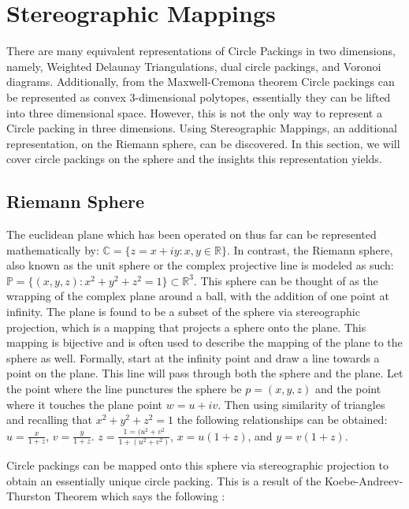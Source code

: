 \documentclass[11pt]{article}
\newcommand{\R}{\mathbb{R}}
\newcommand{\C}{\mathbb{C}}
\theoremstyle{definition}
\begin{document}
\section{Stereographic Mappings}

	There are many equivalent representations of Circle Packings in two dimensions, namely, Weighted Delaunay Triangulations, dual circle packings, and Voronoi diagrams. 
	Additionally, from the Maxwell-Cremona theorem Circle packings can be represented as convex 3-dimensional polytopes, essentially they can be lifted into three dimensional space. 
	However, this is not the only way to represent a Circle packing in three dimensions. 
	Using Stereographic Mappings, an additional representation, on the Riemann sphere, can be discovered. 
	In this section, we will cover circle packings on the sphere and the insights this representation yields.

\subsection{Riemann Sphere}
	The euclidean plane which has been operated on thus far can be represented mathematically by: $\C = \{z = x + iy : x, y \in \R \}$. 
	In contrast, the Riemann sphere, also known as the unit sphere or the complex projective line is modeled as such: $\mathbb{P} = \{(x,y,z):x^2 + y^2 + z^2 = 1\} \subset \R^3$. 
	This sphere can be thought of as the wrapping of the complex plane around a ball, with the addition of one point at infinity. 
	The plane is found to be a subset of the sphere via stereographic projection, which is a mapping that projects a sphere onto the plane. 
	This mapping is bijective and is often used to describe the mapping of the plane to the sphere as well. 
	Formally, start at the infinity point and draw a line towards a point on the plane. 
	This line will pass through both the sphere and the plane. 
	Let the point where the line punctures the sphere be $p = (x,y,z)$ and the point where it touches the plane point $w = u + iv$. 
	Then using similarity of triangles and recalling that $x^2 + y^2 + z^2 = 1$ the following relationships can be obtained: $u = \frac{x}{1 + z}$, $v = \frac{y}{1+ z}$. $z = \frac{1 = (u^2 + v^2}{1 + (u^2 + v^2)}$, $x = u(1+z)$, and $y =v(1+z)$.

	Circle packings can be mapped onto this sphere via stereographic projection to obtain an essentially unique circle packing. 
	This is a result of the Koebe-Andreev-Thurston Theorem which says the following \cite{stephenson05introduction}:
\end{document}
